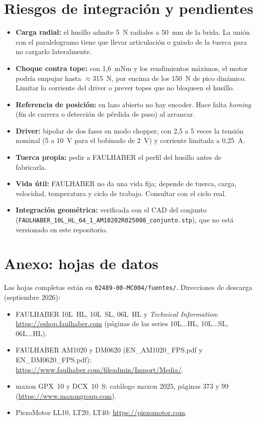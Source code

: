 \documentclass[11pt,a4paper]{article}
\begin{document}
\section{Riesgos de integración y pendientes}
\label{sec:riesgos}
\begin{itemize}
  \item \textbf{Carga radial:} el husillo admite 5~N radiales a 50~mm de la brida. La unión con el
        paralelogramo tiene que llevar articulación o guiado de la tuerca para no cargarlo lateralmente.
  \item \textbf{Choque contra tope:} con 1,6~mNm y los rendimientos máximos, el motor podría empujar hasta
        $\approx$315~N, por encima de los 150~N de pico dinámico. Limitar la corriente del driver o prever
        topes que no bloqueen el husillo.
  \item \textbf{Referencia de posición:} en lazo abierto no hay encoder. Hace falta \emph{homing} (fin de
        carrera o detección de pérdida de paso) al arrancar.
  \item \textbf{Driver:} bipolar de dos fases en modo chopper, con 2,5 a 5 veces la tensión nominal
        (5 a 10~V para el bobinado de 2~V) y corriente limitada a 0,25~A.
  \item \textbf{Tuerca propia:} pedir a FAULHABER el perfil del husillo antes de fabricarla.
  \item \textbf{Vida útil:} FAULHABER no da una vida fija; depende de tuerca, carga, velocidad, temperatura y
        ciclo de trabajo. Consultar con el ciclo real.
  \item \textbf{Integración geométrica:} verificada con el CAD del conjunto
        (\texttt{FAULHABER\_10L\_HL\_64\_1\_\allowbreak AM10202R025008\_\allowbreak conjunto.stp}),
        que no está versionado en este repositorio.
\end{itemize}

\section{Anexo: hojas de datos}
\label{sec:anexo}
Las hojas completas están en \texttt{02489-00-MC004/fuentes/}. Direcciones de descarga (septiembre 2026):

{\small
\begin{itemize}
  \item FAULHABER 10L~HL, 10L~SL, 06L~HL y \emph{Technical Information}: \url{https://eshop.faulhaber.com}
        (páginas de las series 10L...HL, 10L...SL, 06L...HL).
  \item FAULHABER AM1020 y DM0620 (EN\_AM1020\_FPS.pdf y EN\_DM0620\_FPS.pdf):\newline
        \url{https://www.faulhaber.com/fileadmin/Import/Media/}.
  \item maxon GPX~10 y DCX~10~S: catálogo maxon 2025, páginas 373 y 99 (\url{https://www.maxongroup.com}).
  \item PiezoMotor LL10, LT20, LT40: \url{https://piezomotor.com}.
\end{itemize}}
\end{document}
